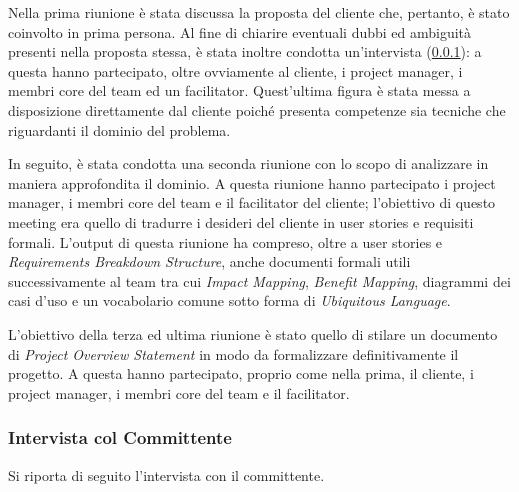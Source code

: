 Nella prima riunione è stata discussa la proposta del cliente che, pertanto, è stato coinvolto in prima persona.
Al fine di chiarire eventuali dubbi ed ambiguità presenti nella proposta stessa, è stata inoltre condotta un'intervista (\ref{sec:interview}): a questa hanno partecipato, oltre ovviamente al cliente, i project manager, i membri core del team ed un facilitator. Quest'ultima figura è stata messa a disposizione direttamente dal cliente poiché presenta competenze sia tecniche che riguardanti il dominio del problema.

In seguito, è stata condotta una seconda riunione con lo scopo di analizzare in maniera approfondita il dominio.
A questa riunione hanno partecipato i project manager, i membri core del team e il facilitator del cliente; l'obiettivo di questo meeting era quello di tradurre i desideri del cliente in user stories e requisiti formali.
L'output di questa riunione ha compreso, oltre a user stories e \textit{Requirements Breakdown Structure}, anche documenti formali utili successivamente al team tra cui \textit{Impact Mapping}, \textit{Benefit Mapping}, diagrammi dei casi d'uso e un vocabolario comune sotto forma di \textit{Ubiquitous Language}.

L'obiettivo della terza ed ultima riunione è stato quello di stilare un documento di \textit{Project Overview Statement} in modo da formalizzare definitivamente il progetto.
A questa hanno partecipato, proprio come nella prima, il cliente, i project manager, i membri core del team e il facilitator.

\subsubsection{Intervista col Committente}\label{sec:interview}
Si riporta di seguito l'intervista con il committente.



